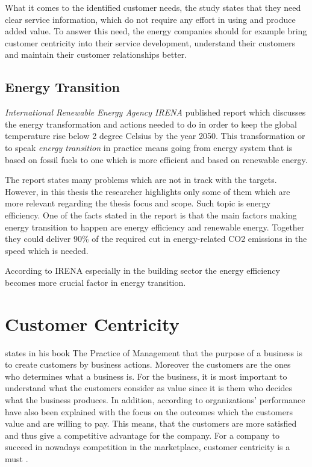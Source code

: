 What it comes to the identified customer needs, the study \parencite{Deloitte} states that they need clear service information, which do not require any effort in using and produce added value. To answer this need, the energy companies should for example bring customer centricity into their service development, understand their customers and maintain their customer relationships better.

\subsection{Energy Transition}

\emph{International Renewable Energy Agency IRENA} published report which discusses the energy transformation and actions needed to do in order to keep the global temperature rise below 2 degree Celsius by the year 2050. This transformation or to speak \emph{energy transition} in practice means going from energy  system that is based on fossil fuels to one which is more efficient and based on renewable energy.

The report \parencite{} states many problems which are not in track with the targets. However, in this thesis the researcher highlights only some of them which are more relevant regarding the thesis focus and scope. Such topic is energy efficiency. One of the facts stated in the report is that the main factors making energy transition to happen are energy efficiency and renewable energy. Together they could deliver 90\% of the required cut in energy-related CO2 emissions in the speed which is needed.

According to IRENA especially in the building sector the energy efficiency becomes more crucial factor in energy transition.

\section{Customer Centricity}

\textcite{Drucker:2007} states in his book The Practice of Management that the purpose of a business is to create customers by business actions. Moreover the customers are the ones who determines what a business is. For the business, it is most important to understand what the customers consider as value since it is them who decides what the business produces. In addition, according to \textcite{Parniangtong:2017} organizations' performance have also been explained with the focus on the outcomes which the customers value and are willing to pay. This means, that the customers are more satisfied and thus give a competitive advantage for the company. For a company to succeed in nowadays competition in the marketplace, customer centricity is a must \parencite{PathToCustomerCentricity:2006}.

